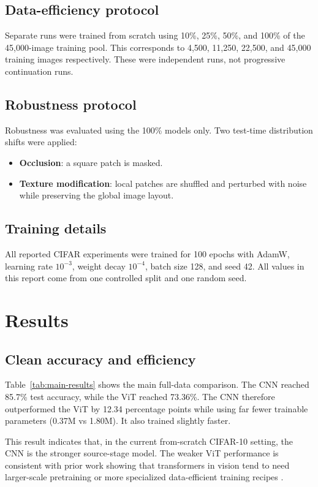 \documentclass[11pt]{article}
\begin{document}
\subsection{Data-efficiency protocol}
Separate runs were trained from scratch using 10\%, 25\%, 50\%, and 100\% of the 45{,}000-image training pool. This corresponds to 4{,}500, 11{,}250, 22{,}500, and 45{,}000 training images respectively. These were independent runs, not progressive continuation runs.

\subsection{Robustness protocol}
Robustness was evaluated using the 100\% models only. Two test-time distribution shifts were applied:
\begin{itemize}
    \item \textbf{Occlusion}: a square patch is masked.
    \item \textbf{Texture modification}: local patches are shuffled and perturbed with noise while preserving the global image layout.
\end{itemize}

\subsection{Training details}
All reported CIFAR experiments were trained for 100 epochs with AdamW, learning rate $10^{-3}$, weight decay $10^{-4}$, batch size 128, and seed 42. All values in this report come from one controlled split and one random seed.

\section{Results}
\subsection{Clean accuracy and efficiency}
Table~\ref{tab:main-results} shows the main full-data comparison. The CNN reached 85.7\% test accuracy, while the ViT reached 73.36\%. The CNN therefore outperformed the ViT by 12.34 percentage points while using far fewer trainable parameters (0.37M vs 1.80M). It also trained slightly faster.

This result indicates that, in the current from-scratch CIFAR-10 setting, the CNN is the stronger source-stage model. The weaker ViT performance is consistent with prior work showing that transformers in vision tend to need larger-scale pretraining or more specialized data-efficient training recipes \cite{dosovitskiy2021image,touvron2021training}.
\end{document}
